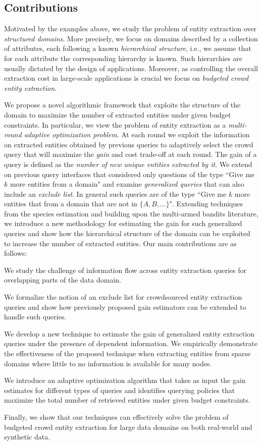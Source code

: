 \subsection{Contributions}
\label{sec:contributions}
Motivated by the examples above, we study the problem of entity extraction over {\em structured domains}. More precisely, we focus on domains described by a collection of attributes, each following a known {\em hierarchical structure}, i.e., we assume that for each attribute the corresponding hierarchy is known. Such hierarchies are usually dictated by the design of applications. Moreover, as controlling the overall extraction cost in large-scale applications is crucial we focus on {\em budgeted crowd entity extraction}. 

We propose a novel algorithmic framework that exploits the structure of the domain to maximize the number of extracted entities under given budget constraints. In particular, we view the problem of entity extraction as a {\em multi-round adaptive optimization problem}. At  each round we exploit the information on extracted entities obtained by previous queries to adaptively select the crowd query that will maximize the {\em gain} and cost trade-off at each round. The gain of a query is defined as the {\em number of new unique entities extracted by it}. We extend on previous query interfaces that considered only questions of the type ``Give me $k$ more entities from a domain" and examine {\em generalized queries} that can also include an {\em exclude list}. In general such queries are of the type ``Give me $k$ more entities that from a domain that are not in $\{A, B, ...\}$". Extending techniques from the species estimation and building upon the multi-armed bandits literature, we introduce a new methodology for estimating the gain for such generalized queries and show how the hierarchical structure of the domain can be exploited to increase the number of extracted entities. Our main contributions are as follows:

\squishlist
\item We study the challenge of information flow across entity extraction queries for overlapping parts of the data domain.
\item We formalize the notion of an exclude list for crowdsourced entity extraction queries and show how previously proposed gain estimators can be extended to handle such queries.
\item We develop a new technique to estimate the gain of generalized entity extraction queries under the presence of dependent information. We empirically demonstrate the effectiveness of the proposed technique when extracting entities from sparse domains where little to no information is available for many nodes.
\item We introduce an adaptive optimization algorithm that takes as input the gain estimates for different types of queries and identifies querying policies that maximize the total number of retrieved entities under given budget constraints. 
\item Finally, we show that our techniques can effectively solve the problem of budgeted crowd entity extraction for large data domains on both real-world and synthetic data.
\squishend

